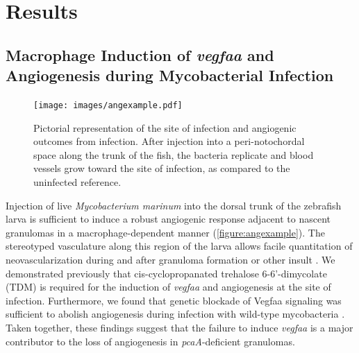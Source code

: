 \section{Results}

\subsection{Macrophage Induction of \textit{vegfaa} and Angiogenesis during Mycobacterial Infection}

\begin{figure}
\centering
\texttt{[image: images/angexample.pdf]}
\caption{Pictorial representation of the site of infection and angiogenic outcomes from infection. After injection into a peri-notochordal space along the trunk of the fish, the bacteria replicate and blood vessels grow toward the site of infection, as compared to the uninfected reference.}
\label{figure:angexample}

\end{figure}

Injection of live \textit{Mycobacterium marinum} into the dorsal trunk of the zebrafish larva is sufficient to induce a robust angiogenic response adjacent to nascent granulomas in a macrophage-dependent manner \citep{Oehlers2015} (\autoref{figure:angexample}). The stereotyped vasculature along this region of the larva allows facile quantitation of neovascularization during and after granuloma formation or other insult \citep{Lawson2002, Jin2005, Gore2012, Matsuoka2018}. We demonstrated previously that cis-cyclopropanated trehalose 6-6'-dimycolate (TDM) is required for the induction of \textit{vegfaa} and angiogenesis at the site of infection. Furthermore, we found that genetic blockade of Vegfaa signaling was sufficient to abolish angiogenesis during infection with wild-type mycobacteria \citep{Walton2018}. Taken together, these findings suggest that the failure to induce \textit{vegfaa} is a major contributor to the loss of angiogenesis in \textit{pcaA}-deficient granulomas.

